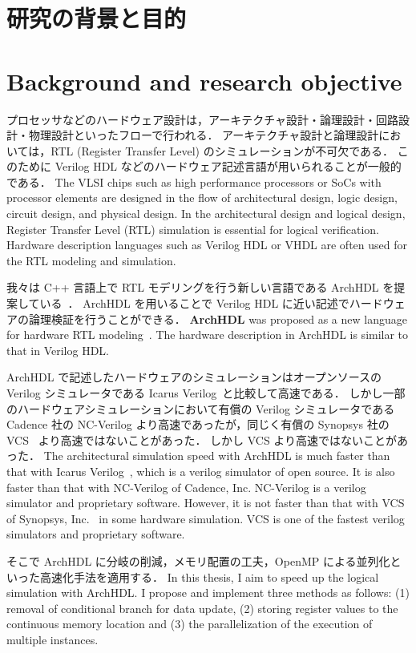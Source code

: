 \section{研究の背景と目的}
\fi
\section{Background and research objective}

プロセッサなどのハードウェア設計は，アーキテクチャ設計・論理設計・回路設計・物理設計といったフローで行われる．
アーキテクチャ設計と論理設計においては，RTL (Register Transfer Level) のシミュレーションが不可欠である．
このために Verilog HDL などのハードウェア記述言語が用いられることが一般的である．
\fi
The VLSI chips such as high performance processors or SoCs with processor elements are designed in the flow of architectural design,
logic design, circuit design, and physical design.
In the architectural design and logical design, Register Transfer Level (RTL) simulation is essential for logical verification.
Hardware description languages such as Verilog HDL or VHDL are often used for the RTL modeling and simulation.

我々は C++ 言語上で RTL モデリングを行う新しい言語である ArchHDL を提案している~\cite{satos:archhdl}．
ArchHDL を用いることで Verilog HDL に近い記述でハードウェアの論理検証を行うことができる．
\fi
\textbf{ArchHDL} was proposed as a new language for hardware RTL modeling~\cite{satos:archhdl}.
The hardware description in ArchHDL is similar to that in Verilog HDL.

ArchHDL で記述したハードウェアのシミュレーションはオープンソースの Verilog シミュレータである Icarus Verilog~\cite{iverilog}と比較して高速である．
しかし一部のハードウェアシミュレーションにおいて有償の Verilog シミュレータである Cadence 社の NC-Verilog より高速であったが，同じく有償の Synopsys 社の VCS~\cite{vcs} より高速ではないことがあった．
しかし VCS より高速ではないことがあった．
\fi
The architectural simulation speed with ArchHDL is much faster than
that with Icarus Verilog~\cite{iverilog}, which is a verilog simulator of open source.
It is also faster than that with NC-Verilog of Cadence, Inc.
NC-Verilog is a verilog simulator and proprietary software.
However, it is not faster than that with VCS of Synopsys, Inc.~\cite{vcs} in some hardware simulation.
VCS is one of the fastest verilog simulators and proprietary software.

そこで ArchHDL に分岐の削減，メモリ配置の工夫，OpenMP による並列化といった高速化手法を適用する．
\fi
In this thesis, I aim to speed up the logical simulation with ArchHDL.
I propose and implement three methods as follows:
(1) removal of conditional branch for data update,
(2) storing register values to the continuous memory location
and (3) the parallelization of the execution of multiple instances.

